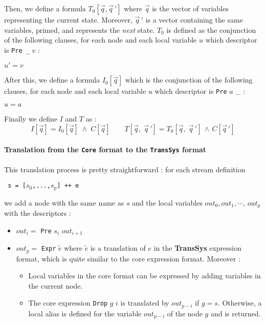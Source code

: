 Then, we define a formula $T_0[\vec q, \vec q \,']$ where $\vec q$ is the vector of variables representing the current state. Moreover, $\vec q \,'$ is a vector containing the same variables, primed, and represents the \textit{next} state. $T_0$ is defined as the conjunction of the following clauses, for each node and each local variable $u$ which descriptor is \texttt{Pre \_} $v$ :
\begin{center} $u' = v$ \end{center}
After this, we define a formula $I_0[\vec q]$ which is the conjunction of the following clauses, for each node and each local variable $u$ which descriptor is \texttt{Pre} $a$ \_ :
\begin{center} $u = a$ \end{center}
Finally we define $I$ and $T$ as :
\[  I[\vec q] =  I_0[\vec q] \;\wedge\; C[\vec q] \qquad T[\vec q, \; \vec q \, '] = T_0[\vec q, \; \vec q \,'] \, \wedge \, C[\vec q \, ']  \]




\paragraph{Translation from the \texttt{Core} format to the \texttt{TransSys} format}

This translation process is pretty straightforward : for each stream definition
\begin{center}\texttt{ s = [$s_0$,...,$s_p$] ++ e}\end{center}
we add a node with the same name as $s$ and the local variables $out_0, out_1, \cdots, \, out_p$ with the descriptors :

\begin{itemize}
\item $out_{i} = $  \texttt{Pre} $s_i$  $out_{i + 1}$
\item $out_{p} = $  \texttt{Expr} $\tilde e$  where $\tilde e$ is a translation of $e$ in the \textbf{TransSys} expression format, which is quite similar to the core expression format. Moreover :

\begin{itemize}
\item Local variables in the core format can be expressed by adding variables in the current node.
\item The core expression \texttt{Drop} $g$ $i$ is translated by $out_{p - i}$ if $g = s$. Otherwise, a local alias is defined for the variable $out_{p - i}$ of the node $g$ and is returned.
\end{itemize}

\end{itemize}

